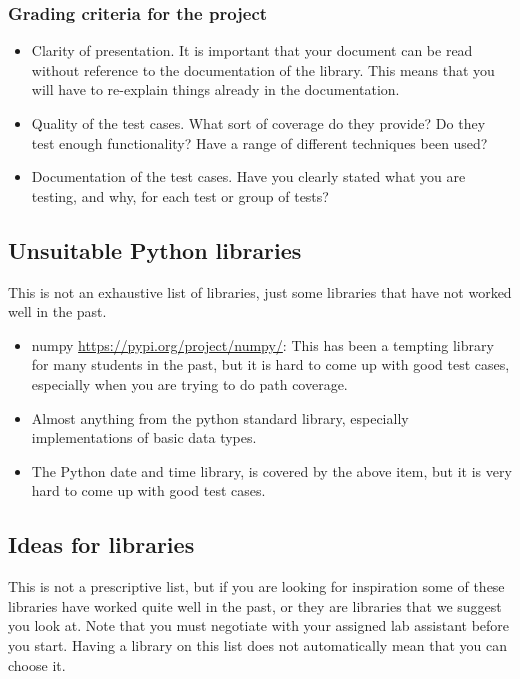 \documentclass[a4paper]{article}
\begin{document}
\subsubsection*{Grading criteria for the project}
\begin{itemize}
\item Clarity of presentation. It is important that your document can
  be read without reference to the documentation of the library. This
  means that you will have to re-explain things already in the
  documentation. 
\item Quality of the test cases. What sort of coverage do they
  provide? Do they test enough functionality? Have a range of different 
  techniques been used?
\item Documentation of the test cases. Have you clearly stated what you are
  testing, and why, for each test or group of tests? 

 
\end{itemize}

\subsection*{Unsuitable Python libraries}
This is not an exhaustive list of libraries, just some libraries that
have not worked well in the past.
\begin{itemize}
\item numpy \url{https://pypi.org/project/numpy/}: This has been a
  tempting library for many students in the past, but it is hard to
  come up with good test cases, especially when you are trying to do
  path coverage.
\item Almost anything from the python standard library, especially
  implementations of basic data types.
\item The Python date and time library, is covered by the above item,
  but it is very hard to come up with good test cases.
  
\end{itemize}



\subsection*{Ideas for libraries}
This is not a prescriptive list, but if you are looking for
inspiration some of these libraries have worked quite well in the
past, or they are libraries that we suggest you look at. Note that you
must negotiate with your assigned lab assistant before you
start.  Having a library on this list does not automatically mean
that you can choose it. 
\end{document}
